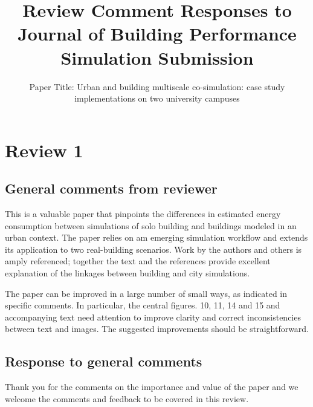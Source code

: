\documentclass[answers,12pt]{exam}
\title{Review Comment Responses to Journal of Building Performance Simulation Submission}
\subtitle{Paper Title: Urban and building multiscale co-simulation: case study implementations on two university campuses 
}
\begin{document}
\maketitle

\section{Review 1}

\subsection{General comments from reviewer}
This is a valuable paper that pinpoints the differences in estimated energy consumption between simulations of solo building and buildings modeled in an urban context.  The paper relies on am emerging simulation workflow and extends its application to two real-building scenarios.  Work by the authors and others is amply referenced; together the text and the references provide excellent explanation of the linkages between building and city simulations. 

The paper can be improved in a large number of small ways, as indicated in specific comments.  In particular, the central figures. 10, 11, 14 and 15 and accompanying text need attention to improve clarity and correct inconsistencies between text and images.  The suggested improvements should be straightforward. 

\subsection{Response to general comments}
\begin{solution}
Thank you for the comments on the importance and value of the paper and we welcome the comments and feedback to be covered in this review.
\end{solution}
\end{document}
